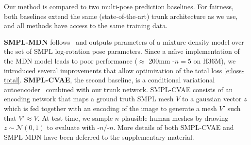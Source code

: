Our method is compared to two multi-pose prediction baselines. For fairness, both baselines extend the same (state-of-the-art) trunk architecture as we use, and all methods have access to the same training data. 

\textbf{SMPL-MDN} follows~\cite{li19generating} and outputs parameters of a mixture density model over the set of SMPL log-rotation pose parameters. 
Since a na\"{\i}ve implementation of the MDN model leads to poor performance ($\approx$ 200mm \MPJPE-$n=5$ on H36M), we introduced several improvements that allow optimization of the total loss \cref{e:loss-total}.
\textbf{SMPL-CVAE}, the second baseline, is a conditional variational autoencoder~\cite{sohn2015cvae} combined with our trunk network.
SMPL-CVAE consists of an encoding network that maps a ground truth SMPL mesh $V$ to a gaussian vector $z$ which is fed together with an encoding of the image to generate a mesh $V'$ such that $V' \approx V$. At test time, we sample $n$ plausible human meshes by drawing $z \sim \mathcal{N}(0, 1)$ to evaluate with \MPJPE-$n$/\RE-$n$.
More details of both SMPL-CVAE and SMPL-MDN have been deferred to the supplementary material.

